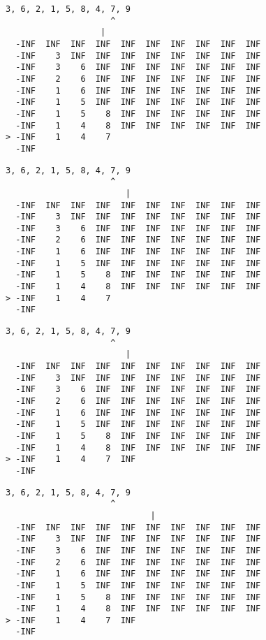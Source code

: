 { \begin{verbatim}
3, 6, 2, 1, 5, 8, 4, 7, 9
                     ^
                   |
  -INF  INF  INF  INF  INF  INF  INF  INF  INF  INF
  -INF    3  INF  INF  INF  INF  INF  INF  INF  INF
  -INF    3    6  INF  INF  INF  INF  INF  INF  INF
  -INF    2    6  INF  INF  INF  INF  INF  INF  INF
  -INF    1    6  INF  INF  INF  INF  INF  INF  INF
  -INF    1    5  INF  INF  INF  INF  INF  INF  INF
  -INF    1    5    8  INF  INF  INF  INF  INF  INF
  -INF    1    4    8  INF  INF  INF  INF  INF  INF
> -INF    1    4    7                              
  -INF                                             
\end{verbatim} }

{ \begin{verbatim}
3, 6, 2, 1, 5, 8, 4, 7, 9
                     ^
                        |
  -INF  INF  INF  INF  INF  INF  INF  INF  INF  INF
  -INF    3  INF  INF  INF  INF  INF  INF  INF  INF
  -INF    3    6  INF  INF  INF  INF  INF  INF  INF
  -INF    2    6  INF  INF  INF  INF  INF  INF  INF
  -INF    1    6  INF  INF  INF  INF  INF  INF  INF
  -INF    1    5  INF  INF  INF  INF  INF  INF  INF
  -INF    1    5    8  INF  INF  INF  INF  INF  INF
  -INF    1    4    8  INF  INF  INF  INF  INF  INF
> -INF    1    4    7                              
  -INF                                             
\end{verbatim} }

{ \begin{verbatim}
3, 6, 2, 1, 5, 8, 4, 7, 9
                     ^
                        |
  -INF  INF  INF  INF  INF  INF  INF  INF  INF  INF
  -INF    3  INF  INF  INF  INF  INF  INF  INF  INF
  -INF    3    6  INF  INF  INF  INF  INF  INF  INF
  -INF    2    6  INF  INF  INF  INF  INF  INF  INF
  -INF    1    6  INF  INF  INF  INF  INF  INF  INF
  -INF    1    5  INF  INF  INF  INF  INF  INF  INF
  -INF    1    5    8  INF  INF  INF  INF  INF  INF
  -INF    1    4    8  INF  INF  INF  INF  INF  INF
> -INF    1    4    7  INF                         
  -INF                                             
\end{verbatim} }

{ \begin{verbatim}
3, 6, 2, 1, 5, 8, 4, 7, 9
                     ^
                             |
  -INF  INF  INF  INF  INF  INF  INF  INF  INF  INF
  -INF    3  INF  INF  INF  INF  INF  INF  INF  INF
  -INF    3    6  INF  INF  INF  INF  INF  INF  INF
  -INF    2    6  INF  INF  INF  INF  INF  INF  INF
  -INF    1    6  INF  INF  INF  INF  INF  INF  INF
  -INF    1    5  INF  INF  INF  INF  INF  INF  INF
  -INF    1    5    8  INF  INF  INF  INF  INF  INF
  -INF    1    4    8  INF  INF  INF  INF  INF  INF
> -INF    1    4    7  INF                         
  -INF                                             
\end{verbatim} }

